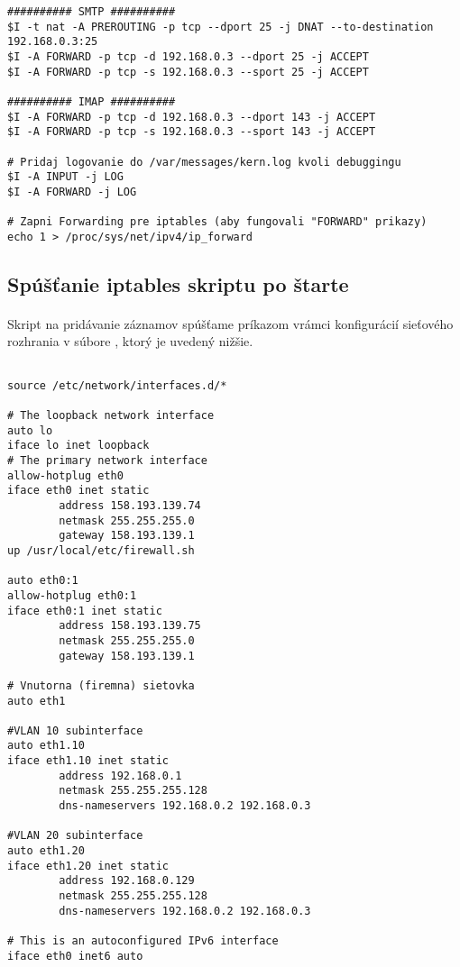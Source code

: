 {\begin{small}
\begin{verbatim}
########## SMTP ##########
$I -t nat -A PREROUTING -p tcp --dport 25 -j DNAT --to-destination 192.168.0.3:25
$I -A FORWARD -p tcp -d 192.168.0.3 --dport 25 -j ACCEPT
$I -A FORWARD -p tcp -s 192.168.0.3 --sport 25 -j ACCEPT

########## IMAP ##########
$I -A FORWARD -p tcp -d 192.168.0.3 --dport 143 -j ACCEPT
$I -A FORWARD -p tcp -s 192.168.0.3 --sport 143 -j ACCEPT

# Pridaj logovanie do /var/messages/kern.log kvoli debuggingu
$I -A INPUT -j LOG
$I -A FORWARD -j LOG

# Zapni Forwarding pre iptables (aby fungovali "FORWARD" prikazy)
echo 1 > /proc/sys/net/ipv4/ip_forward

\end{verbatim}

\end{small}

}

\subsection{Spúšťanie iptables skriptu po štarte}
\paragraph{}
Skript na pridávanie záznamov  spúšťame príkazom  vrámci konfigurácií sieťového rozhrania  v súbore , ktorý je uvedený nižšie.

\noindent
{\selectfont

\begin{small}

\begin{verbatim}

source /etc/network/interfaces.d/*

# The loopback network interface
auto lo
iface lo inet loopback
# The primary network interface
allow-hotplug eth0
iface eth0 inet static
        address 158.193.139.74
        netmask 255.255.255.0
        gateway 158.193.139.1
up /usr/local/etc/firewall.sh

auto eth0:1
allow-hotplug eth0:1
iface eth0:1 inet static
        address 158.193.139.75
        netmask 255.255.255.0
        gateway 158.193.139.1

# Vnutorna (firemna) sietovka
auto eth1

#VLAN 10 subinterface
auto eth1.10
iface eth1.10 inet static
        address 192.168.0.1
        netmask 255.255.255.128
        dns-nameservers 192.168.0.2 192.168.0.3

#VLAN 20 subinterface
auto eth1.20
iface eth1.20 inet static
        address 192.168.0.129
        netmask 255.255.255.128
        dns-nameservers 192.168.0.2 192.168.0.3

# This is an autoconfigured IPv6 interface
iface eth0 inet6 auto

\end{verbatim}

\end{small}

}
